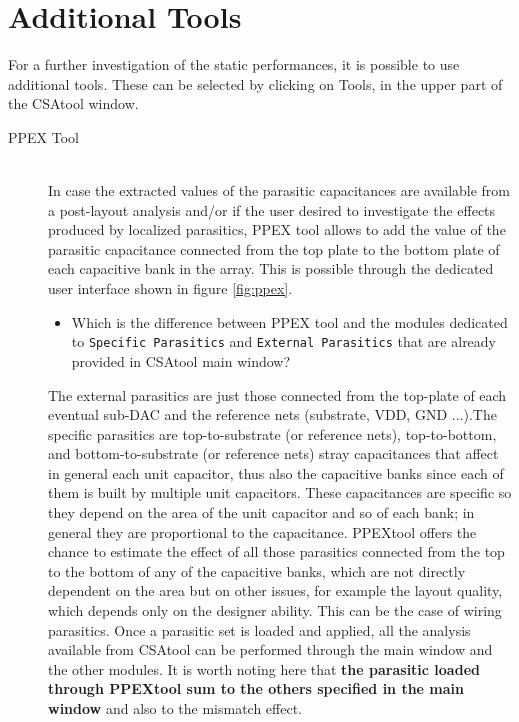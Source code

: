 \label{addtools}

\section{Additional Tools}
For a further investigation of the static performances, it is possible to use additional tools. These can be selected by clicking on Tools, in the upper part of the CSAtool window.

\begin{description}

	\item[PPEX Tool] \hfill \\
	In case the extracted values of the parasitic capacitances are available from a post-layout analysis and/or if the user desired to investigate the effects produced by  localized parasitics, PPEX tool allows to add the value of the parasitic capacitance connected from the top plate to the bottom plate of each capacitive bank in the array. This is possible through the dedicated user interface shown in figure \ref{fig:ppex}. 

\begin{itemize}
\item Which is the difference between PPEX tool and the modules dedicated to \texttt{Specific Parasitics} and  \texttt{External Parasitics} that are already provided in CSAtool main window?
\end{itemize}

The external parasitics are just those connected from the top-plate of each eventual sub-DAC and the reference nets (substrate, VDD, GND ...).The specific parasitics are top-to-substrate (or reference nets), top-to-bottom, and bottom-to-substrate (or reference nets) stray capacitances that affect in general each unit capacitor, thus also the capacitive banks since each of them is built by multiple unit capacitors. These capacitances are specific so they depend on the area of the unit capacitor and so of each bank; in general they are proportional to the capacitance. 
PPEXtool offers the chance to estimate the effect of all those parasitics connected from the top to the bottom of any of the capacitive banks, which are not directly dependent on the area but on other issues, for example the layout quality, which depends only on the designer ability. This can be the case of wiring parasitics. 
Once a parasitic set is loaded and applied, all the analysis available from CSAtool can be performed through the main window and the other modules.
It is worth noting here that \textbf{the parasitic loaded through PPEXtool sum to the others specified in the main window} and also to the mismatch effect. 


\end{description}

